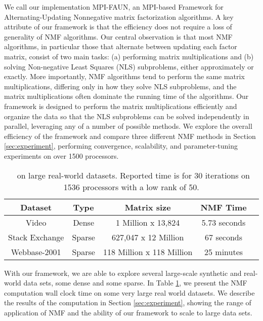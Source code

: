 We call our implementation MPI-FAUN, an MPI-based Framework for Alternating-Updating Nonnegative matrix factorization algorithms.
A key attribute of our framework is that the efficiency does not require a loss of generality of NMF algorithms.
Our central observation is that most NMF algorithms, in particular those that alternate between updating each factor matrix, consist of two main tasks: (a) performing matrix multiplications and (b) solving Non-negative Least Squares (NLS) subproblems, either approximately or exactly.
More importantly, NMF algorithms tend to perform the same matrix multiplications, differing only in how they solve NLS subproblems, and the matrix multiplications often dominate the running time of the algorithms.
Our framework is designed to perform the matrix multiplications efficiently and organize the data so that the NLS subproblems can be solved independently in parallel, leveraging any of a number of possible methods.
We explore the overall efficiency of the framework and compare three different NMF methods in Section \ref{sec:experiment}, performing convergence, scalability, and parameter-tuning experiments on over 1500 processors.

\begin{table}[htp]
\begin{center}
\begin{tabular}{|c|c|c|c|c|}
\hline 
Dataset & Type & Matrix size & NMF Time \\ \hline
Video & Dense & 1 Million x 13,824 &  5.73 seconds \\
Stack Exchange & Sparse & 627,047 x 12 Million &  67 seconds \\
Webbase-2001 & Sparse & 118 Million x 118 Million & 25 minutes \\ \hline
\end{tabular}
\end{center}
\caption{\ParNMF\ on large real-world datasets. Reported time is for 30 iterations on 1536 processors with a low rank of 50.}
\label{tab:teaser}
\end{table}%


With our framework, we are able to explore several large-scale synthetic and real-world data sets, some dense and some sparse. In Table \ref{tab:teaser}, we present the NMF computation wall clock time on some very large real world datasets. We describe the results of the computation in Section \ref{sec:experiment}, showing the range of application of NMF and the ability of our framework to scale to large data sets.  

